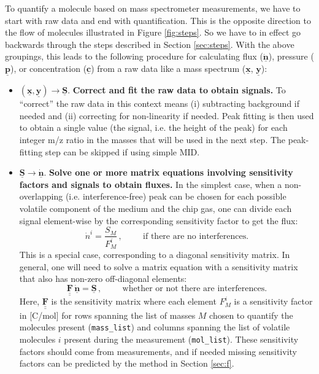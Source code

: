 \documentclass{article}
\newcommand{\code}[1]{\colorbox{codegray}{\lstinline{#1}}}
\renewcommand{\vec}[1]{\underline{\mathbf{#1}}}
\newcommand{\mat}[1]{\underline{\underline{\mathbf{#1}}}}
\begin{document}
To quantify a molecule based on mass spectrometer measurements, we have to start with raw data and end with quantification. This is the opposite direction to the flow of molecules illustrated in Figure \ref{fig:steps}. So we have to in effect go backwards through the steps described in Section \ref{sec:steps}. With the above groupings, this leads to the following procedure for calculating flux ($\vec{\dot{n}}$), pressure ($\vec{p}$), or concentration ($\vec{c}$) from a raw data like a mass spectrum ($\vec{x}$, $\vec{y}$):

\begin{itemize}
	\item $(\vec{x}, \vec{y}) \rightarrow \vec{S}$. \textbf{Correct and fit the raw data to obtain signals.} To ``correct'' the raw data in this context means (i) subtracting background if needed and (ii) correcting for non-linearity if needed. Peak fitting is then used to obtain a single value (the signal, i.e. the height of the peak) for each integer m/z ratio in the masses that will be used in the next step. The peak-fitting step can be skipped if using simple MID.
	
	\item $\vec{S} \rightarrow \vec{\dot{n}}$. \textbf{Solve one or more matrix equations involving sensitivity factors and signals to obtain fluxes.} In the simplest case, when a non-overlapping (i.e. interference-free) peak can be chosen for each possible volatile component of the medium and the chip gas, one can divide each signal element-wise by the corresponding sensitivity factor to get the flux:
	\begin{equation}
	\dot{n}^i = \frac{S_M}{F^i_M}\,, \hspace{1cm} \text{if there are no interferences.}
	\end{equation}
	This is a special case, corresponding to a diagonal sensitivity matrix. In general, one will need to solve a matrix equation with a sensitivity matrix that also has non-zero off-diagonal elements:
	\begin{equation}
	\mat{F} \, \vec{\dot{n}} = \vec{S}\,, \hspace{1cm} \text{whether or not there are interferences.}
	\end{equation}
	Here, $\mat{F}$ is the sensitivity matrix where each element $F_M^i$ is a sensitivity factor in [C/mol] for rows spanning the list of masses $M$ chosen to quantify the molecules present (\code{mass_list}) and columns spanning the list of volatile molecules $i$ present during the measurement (\code{mol_list}). These sensitivity factors should come from measurements, and if needed missing sensitivity factors can be predicted by the method in Section \ref{sec:f}.
	

\end{itemize}
\end{document}
